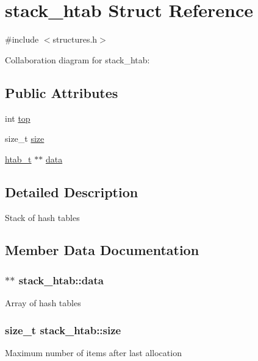 \hypertarget{structstack__htab}{}\section{stack\+\_\+htab Struct Reference}
\label{structstack__htab}


{\ttfamily \#include $<$structures.\+h$>$}



Collaboration diagram for stack\+\_\+htab\+:
\subsection*{Public Attributes}
\begin{DoxyCompactItemize}
\item 
int \hyperlink{structstack__htab_a1bb9f9cb590d2082d0b202f0be999a74}{top}
\item 
size\+\_\+t \hyperlink{structstack__htab_a95f7b033f614ca5941b0f3b2237c059e}{size}
\item 
\hyperlink{structhtab__t}{htab\+\_\+t} $\ast$$\ast$ \hyperlink{structstack__htab_a88d95f776e47e2eb2005e7ee11330b3f}{data}
\end{DoxyCompactItemize}


\subsection{Detailed Description}
Stack of hash tables 

\subsection{Member Data Documentation}
\subsubsection[{\texorpdfstring{data}{data}}]{$\ast$$\ast$ stack\+\_\+htab\+::data}\hypertarget{structstack__htab_a88d95f776e47e2eb2005e7ee11330b3f}{}\label{structstack__htab_a88d95f776e47e2eb2005e7ee11330b3f}
Array of hash tables 
\subsubsection[{\texorpdfstring{size}{size}}]{\setlength{\rightskip}{0pt plus 5cm}size\+\_\+t stack\+\_\+htab\+::size}\hypertarget{structstack__htab_a95f7b033f614ca5941b0f3b2237c059e}{}\label{structstack__htab_a95f7b033f614ca5941b0f3b2237c059e}
Maximum number of items after last allocation 
